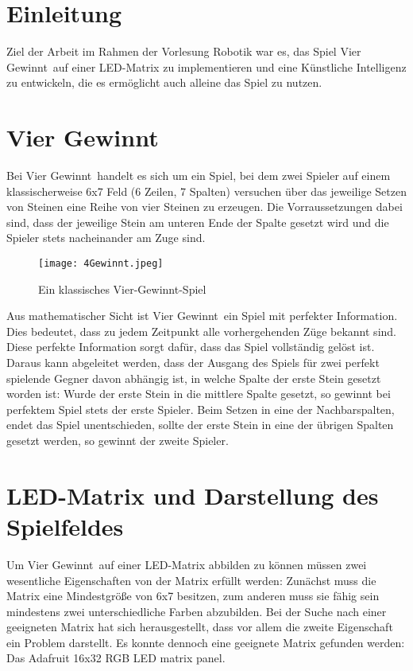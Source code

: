 \section{Einleitung}
Ziel der Arbeit im Rahmen der Vorlesung Robotik war es, das Spiel \glqq Vier Gewinnt\grqq ~auf einer LED-Matrix zu implementieren und eine Künstliche Intelligenz zu entwickeln, die es ermöglicht auch alleine das Spiel zu nutzen.

\section{Vier Gewinnt}
\label{sec:vierg}
Bei \glqq Vier Gewinnt\grqq ~handelt es sich um ein Spiel, bei dem zwei Spieler auf einem klassischerweise 6x7 Feld (6 Zeilen, 7 Spalten) versuchen über das jeweilige Setzen von Steinen eine Reihe von vier Steinen zu erzeugen. Die Vorraussetzungen dabei sind, dass der jeweilige Stein am unteren Ende der Spalte gesetzt wird und die Spieler stets nacheinander am Zuge sind.

\begin{figure}[!hbt]
	\centering
	\texttt{[image: 4Gewinnt.jpeg]}
	\caption{Ein klassisches Vier-Gewinnt-Spiel}
\end{figure}

Aus mathematischer Sicht ist \glqq Vier Gewinnt\grqq ~ein Spiel mit perfekter Information. Dies bedeutet, dass zu jedem Zeitpunkt alle vorhergehenden Züge bekannt sind. Diese perfekte Information sorgt dafür, dass das Spiel vollständig gelöst ist. Daraus kann abgeleitet werden, dass der Ausgang des Spiels für zwei perfekt spielende Gegner davon abhängig ist, in welche Spalte der erste Stein gesetzt worden ist: Wurde der erste Stein in die mittlere Spalte gesetzt, so gewinnt bei perfektem Spiel stets der erste Spieler. Beim Setzen in eine der Nachbarspalten, endet das Spiel unentschieden, sollte der erste Stein in eine der übrigen Spalten gesetzt werden, so gewinnt der zweite Spieler. 

\section{LED-Matrix und Darstellung des Spielfeldes}
Um \glqq Vier Gewinnt\grqq ~auf einer LED-Matrix abbilden zu können müssen zwei wesentliche Eigenschaften von der Matrix erfüllt werden: Zunächst muss die Matrix eine Mindestgröße von 6x7 besitzen, zum anderen muss sie fähig sein mindestens zwei unterschiedliche Farben abzubilden.
Bei der Suche nach einer geeigneten Matrix hat sich herausgestellt, dass vor allem die zweite Eigenschaft ein Problem darstellt.
Es konnte dennoch eine geeignete Matrix gefunden werden:
Das \glqq Adafruit 16x32 RGB LED matrix panel\grqq.

